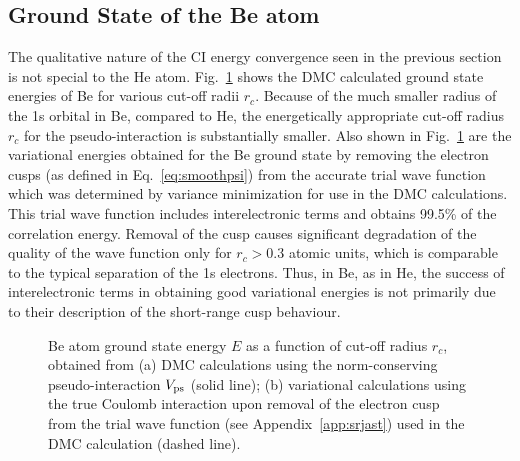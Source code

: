 \subsection{Ground State of the Be atom}
%
%


The qualitative nature of the CI energy convergence seen in the
previous section is not special to the He atom.
Fig.~\ref{fig:BegsE} shows the DMC calculated ground state energies 
of Be for various cut-off radii $r_c$. 
Because of the much smaller radius of the 1s orbital in Be, compared
to He, the energetically appropriate cut-off radius $r_c$ for the 
pseudo-interaction is substantially smaller.
Also shown in Fig.~\ref{fig:BegsE} are the variational energies 
obtained for the Be ground state by removing the electron cusps 
(as defined in Eq.~\ref{eq:smoothpsi}) from the accurate trial 
wave function which was determined by variance minimization for use 
in the DMC calculations. 
This trial wave function includes interelectronic terms and 
obtains 99.5\% of the correlation energy. 
Removal of the cusp causes significant degradation of the quality 
of the wave function only for $r_c>0.3$ atomic units, which is 
comparable to the typical separation of the 1s electrons.
Thus, in Be, as in He, the success of interelectronic terms in 
obtaining good variational energies is not primarily due to their 
description of the short-range cusp behaviour. 

%
%

\begin{figure}[tb]
\begin{center}
  \leavevmode
  \vspace{0.5cm}
  \caption{
    Be atom ground state energy $E$ as a function of 
    cut-off radius $r_c$, obtained from (a) DMC calculations 
    using the norm-conserving pseudo-interaction $V_{\rm ps}$ (solid line);
    (b) variational calculations using the true Coulomb interaction 
    upon removal of the electron cusp from the trial wave function 
    (see Appendix~\protect\ref{app:srjast}) used in the DMC calculation (dashed line).
  } 
  \label{fig:BegsE}
\end{center}
\end{figure}




